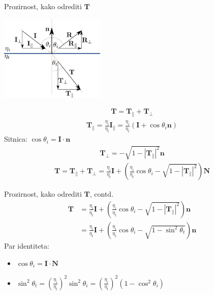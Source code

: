 \documentclass[9pt]{beamer}
\begin{document}
\begin{frame}{Prozirnost, kako odrediti $\mathbf{T}$}
\begin{center}
	\includegraphics[width=5cm]{slike/prozirnost.png}
\end{center}
\begin{align*}
\mathbf{T} = \mathbf{T}_\parallel + \mathbf{T}_\perp
\end{align*}
\begin{align*}
\mathbf{T}_\parallel = \frac{\eta_i}{\eta_t}\mathbf{I}_\parallel = \frac{\eta_i}{\eta_t}(\mathbf{I} + \cos \theta_i \mathbf{n})
\end{align*}
Sitnica: $ \cos \theta_i = \mathbf{I} \cdot \mathbf{n}$
\begin{align*}
\mathbf{T}_\perp = -\sqrt{1- |\mathbf{T}_\parallel|^2}\mathbf{n}
\end{align*}
\begin{align*}
\mathbf{T} = \mathbf{T}_\parallel + \mathbf{T}_\perp = \frac{\eta_i}{\eta_t}\mathbf{I} + \left(\frac{\eta_i}{\eta_t} \cos \theta_i - \sqrt{1- |\mathbf{T}_\parallel|^2}\right)\mathbf{N}
\end{align*}
\end{frame}

\begin{frame}{Prozirnost, kako odrediti $\mathbf{T}$, contd.}
	\begin{align*}
	\mathbf{T} & = \frac{\eta_i}{\eta_t}\mathbf{I} + \left(\frac{\eta_i}{\eta_t} \cos \theta_i - \sqrt{1- |\mathbf{T}_\parallel|^2}\right)\mathbf{n} \\
	  & = \frac{\eta_i}{\eta_t}\mathbf{I} + \left(\frac{\eta_i}{\eta_t} \cos \theta_i - \sqrt{1- \sin^2 \theta_t}\right)\mathbf{n}
	\end{align*}
	Par identiteta:
	\begin{itemize}
		\item $ \cos \theta_i = \mathbf{I} \cdot \mathbf{N}$
		\item $\sin^2 \theta_t = (\frac{\eta_i}{\eta_t})^2\sin^2 \theta_i = (\frac{\eta_i}{\eta_t})^2(1-\cos^2 \theta_i)$
	\end{itemize}
\end{frame}
\end{document}
